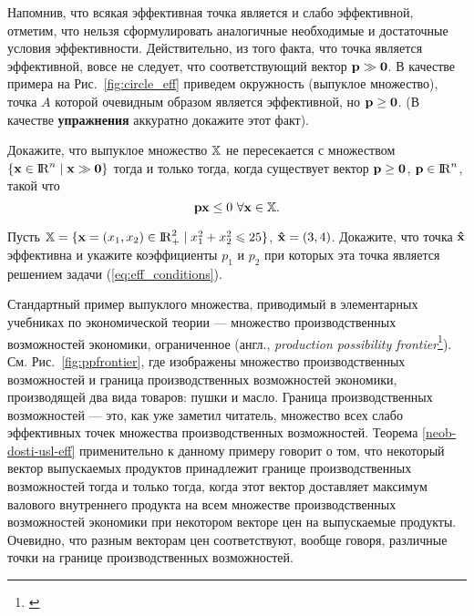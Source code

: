  Напомнив, что всякая эффективная точка
  является и слабо эффективной, отметим, что нельзя сформулировать аналогичные
  необходимые и достаточные условия эффективности.
  Действительно, из того факта, что точка
  является эффективной, вовсе не следует, что соответствующий вектор $\mathbf{p} \gg \mathbf{0}$. В
  качестве примера на Рис.~\ref{fig:circle_eff} приведем окружность (выпуклое
  множество), точка $A$ которой очевидным образом является
  эффективной, но $\mathbf{p} \geq \mathbf{0}$. (В качестве \textbf{упражнения}
  аккуратно докажите этот факт).






\begin{exer}
  \label{neper-pol-ort}
    Докажите, что выпуклое множество $\mathbb{X}$ не пересекается с множеством
    $\{\mathbf{x}\in {\rm I\!R}^{n} \mid  \mathbf{x}\gg \mathbf{0} \}$ тогда и только тогда, когда существует
    вектор
    ${\mathbf{p} \geq \mathbf{0}}$, $\mathbf{p} \in {\rm I\!R}^n$, такой что
\[
    \mathbf{p}\mathbf{x}\leq 0 \ \forall \mathbf{x}\in \mathbb{X}.
\]


\end{exer}

\begin{exer}
    Пусть
    $\mathbb{X}=\{\mathbf{x}=(x_{1},x_{2})\in{\rm I\!R}_{+}^{2}\mid
    x_{1}^{2}+x_{2}^{2}\leqslant25\}$,
    $\mathbf{\hat{x}}=(3,4)$. Докажите, что точка $\mathbf{\hat{x}}$
    эффективна и укажите коэффициенты $p_{1}$ и $p_{2}$ при которых
    эта точка является решением задачи (\ref{eq:eff_conditions}).


\end{exer}






Стандартный пример выпуклого множества, приводимый в элементарных учебниках по экономической
теории --- множество производственных возможностей экономики, ограниченное  (англ., \emph{production possibility
frontier}\footnote{\cite{McConnell:1996}}). См. Рис.~\ref{fig:ppfrontier}, где изображены
множество производственных возможностей и граница производственных возможностей экономики,
производящей два вида товаров: пушки и масло. Граница производственных возможностей --- это,
как уже заметил читатель, множество всех слабо эффективных точек множества производственных
возможностей. Теорема \ref{neob-dosti-usl-eff} применительно к данному примеру говорит о том,
что некоторый вектор выпускаемых продуктов принадлежит границе производственных возможностей
тогда и только тогда, когда этот вектор доставляет максимум валового внутреннего продукта на
всем множестве производственных возможностей экономики при некотором векторе цен на
выпускаемые продукты. Очевидно, что разным векторам цен соответствуют, вообще говоря,
различные точки на границе производственных возможностей.


